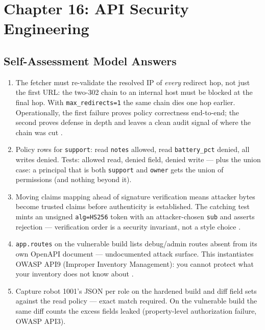 \section{Chapter 16: API Security Engineering}
\label{sec:sol-ch16}

\subsection{Self-Assessment Model Answers}

\begin{enumerate}[label=\textbf{E16.\arabic*.}, leftmargin=2.8em]
  \item The fetcher must re-validate the resolved IP of \emph{every}
    redirect hop, not just the first URL: the two-302 chain to an internal
    host must be blocked at the final hop. With \texttt{max\_redirects=1}
    the same chain dies one hop earlier. Operationally, the first failure
    proves policy correctness end-to-end; the second proves defense in
    depth and leaves a clean audit signal of where the chain was cut
    \cite{owaspapisecurity}.
  \item Policy rows for \texttt{support}: read \texttt{notes} allowed, read
    \texttt{battery\_pct} denied, all writes denied. Tests: allowed read,
    denied field, denied write --- plus the union case: a principal that is
    both \texttt{support} and \texttt{owner} gets the union of permissions
    (and nothing beyond it).
  \item Moving claims mapping ahead of signature verification means attacker
    bytes become trusted claims before authenticity is established. The
    catching test mints an unsigned \texttt{alg=HS256} token with an
    attacker-chosen \texttt{sub} and asserts rejection --- verification
    order is a security invariant, not a style choice \cite{rfc7519}.
  \item \texttt{app.routes} on the vulnerable build lists debug/admin
    routes absent from its own OpenAPI document --- undocumented attack
    surface. This instantiates OWASP API9 (Improper Inventory Management):
    you cannot protect what your inventory does not know about
    \cite{owaspapisecurity}.
  \item Capture robot 1001's JSON per role on the hardened build and diff
    field sets against the read policy --- exact match required. On the
    vulnerable build the same diff counts the excess fields leaked
    (property-level authorization failure, OWASP API3).
\end{enumerate}

